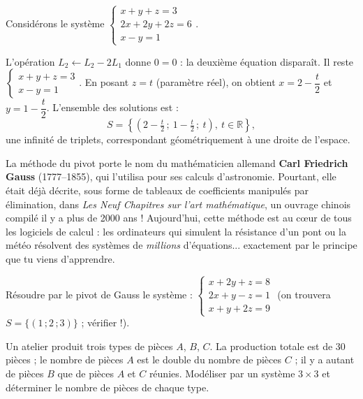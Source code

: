 \documentclass[11pt]{article}
\begin{document}
\begin{exemplebox}[Une ligne $0 = 0$, infinité de solutions]
Considérons le système $\begin{cases} x + y + z = 3 \\ 2x + 2y + 2z = 6 \\ x - y = 1 \end{cases}$.

L'opération $L_2 \leftarrow L_2 - 2L_1$ donne $0 = 0$ : la deuxième équation disparaît. Il reste $\begin{cases} x + y + z = 3 \\ x - y = 1 \end{cases}$. En posant $z = t$ (paramètre réel), on obtient $x = 2 - \dfrac{t}{2}$ et $y = 1 - \dfrac{t}{2}$. L'ensemble des solutions est :
\[
S = \left\{ \left(2 - \tfrac{t}{2}\,;\ 1 - \tfrac{t}{2}\,;\ t\right),\ t \in \mathbb{R} \right\},
\]
une infinité de triplets, correspondant géométriquement à une droite de l'espace.
\end{exemplebox}

\begin{savaistu}
La méthode du pivot porte le nom du mathématicien allemand \textbf{Carl Friedrich Gauss} (1777--1855), qui l'utilisa pour ses calculs d'astronomie. Pourtant, elle était déjà décrite, sous forme de tableaux de coefficients manipulés par élimination, dans \emph{Les Neuf Chapitres sur l'art mathématique}, un ouvrage chinois compilé il y a plus de 2000 ans ! Aujourd'hui, cette méthode est au cœur de tous les logiciels de calcul : les ordinateurs qui simulent la résistance d'un pont ou la météo résolvent des systèmes de \emph{millions} d'équations... exactement par le principe que tu viens d'apprendre.
\end{savaistu}

\begin{exercice}
Résoudre par le pivot de Gauss le système :
$\begin{cases} x + 2y + z = 8 \\ 2x + y - z = 1 \\ x + y + 2z = 9 \end{cases}$ \quad (on trouvera $S = \{(1\,;2\,;3)\}$ ; vérifier !).
\end{exercice}

\begin{exercice}
Un atelier produit trois types de pièces $A$, $B$, $C$. La production totale est de 30 pièces ; le nombre de pièces $A$ est le double du nombre de pièces $C$ ; il y a autant de pièces $B$ que de pièces $A$ et $C$ réunies. Modéliser par un système $3\times 3$ et déterminer le nombre de pièces de chaque type.
\end{exercice}
\end{document}
